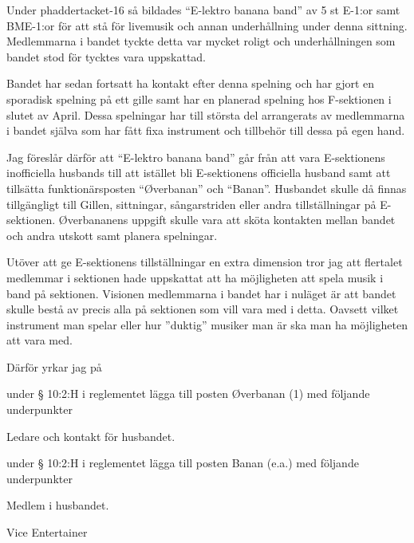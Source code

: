 \documentclass[../_main/handlingar.tex]{subfiles}
\begin{document}

Under phaddertacket-16 så bildades ``E-lektro banana band'' av 5 st E-1:or samt BME-1:or för att stå för livemusik och annan underhållning under denna sittning.
Medlemmarna i bandet tyckte detta var mycket roligt och underhållningen som bandet stod för tycktes vara uppskattad.

Bandet har sedan fortsatt ha kontakt efter denna spelning och har gjort en sporadisk spelning på ett gille samt har en planerad spelning hos F-sektionen i slutet av April. Dessa spelningar har till största del arrangerats av medlemmarna i bandet själva som har fått fixa instrument och tillbehör till dessa på egen hand.

Jag föreslår därför att ``E-lektro banana band'' går från att vara E-sektionens inofficiella husbands till att istället bli E-sektionens officiella husband samt att tillsätta funktionärsposten ``Øverbanan'' och ``Banan''. Husbandet skulle då finnas tillgängligt till Gillen, sittningar, sångarstriden eller andra tillställningar på E-sektionen. Øverbananens uppgift skulle vara att sköta kontakten mellan bandet och andra utskott samt planera spelningar.

Utöver att ge E-sektionens tillställningar en extra dimension tror jag att flertalet medlemmar i sektionen hade uppskattat att ha möjligheten att spela musik i band på sektionen. Visionen medlemmarna i bandet har i nuläget är att bandet skulle bestå av precis alla på sektionen som vill vara med i detta. Oavsett vilket instrument man spelar eller hur ”duktig” musiker man är ska man ha möjligheten att vara med.

Därför yrkar jag på
\begin{attsatser}
    \att under § 10:2:H i reglementet lägga till posten Øverbanan (1) med följande underpunkter
    \begin{itshape}
    \begin{itemizedash}
            \item Ledare och kontakt för husbandet.
     \end{itemizedash}
     \end{itshape}
     \att under § 10:2:H i reglementet lägga till posten Banan (e.a.) med följande underpunkter
     \begin{itshape}
     \begin{itemizedash}
             \item Medlem i husbandet.
      \end{itemizedash}
      \end{itshape}
\end{attsatser}

\begin{signatures}{1}
    \mvh
    \signature{Max Mauritsson}{Vice Entertainer}
\end{signatures}
\end{document}
